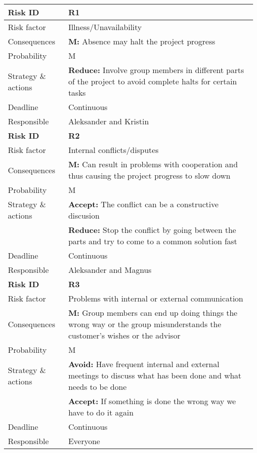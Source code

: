 
\begin{longtable}{>{\setlength\hsize{.3\hsize}}X|>{\setlength\hsize{0.7\hsize}}X}\hline
\textbf{Risk ID} & \textbf{R1} \\ \hline \hline
Risk factor & Illness/Unavailability \\
Consequences & \textbf{M:} Absence may halt the project progress \\
Probability & M \\
Strategy \& actions & \textbf{Reduce:} Involve group members in different parts of the project to avoid complete halts for certain tasks \\
Deadline & Continuous \\
Responsible & Aleksander and Kristin \\ \hline

\newpage

\hline
\textbf{Risk ID} & \textbf{R2} \\ \hline \hline
Risk factor & Internal conflicts/disputes \\
Consequences & \textbf{M:} Can result in problems with cooperation and thus causing the project progress to slow down \\
Probability & M \\
Strategy \& actions & \textbf{Accept:} The conflict can be a constructive discusion\\
 & \textbf{Reduce:} Stop the conflict by going between the parts and try to come to a common solution fast \\
Deadline & Continuous \\
Responsible & Aleksander and Magnus\\ \hline

\textbf{Risk ID} & \textbf{R3} \\ \hline \hline
Risk factor & Problems with internal or external communication \\
Consequences & \textbf{M:} Group members can end up doing things the wrong way or the group misunderstands the customer's wishes or the advisor\\
Probability & M \\
Strategy \& actions & \textbf{Avoid:} Have frequent internal and external meetings to discuss what has been done and what needs to be done\\
 & \textbf{Accept:} If something is done the wrong way we have to do it again \\
Deadline & Continuous \\
Responsible & Everyone \\ \hline


\end{longtable}
